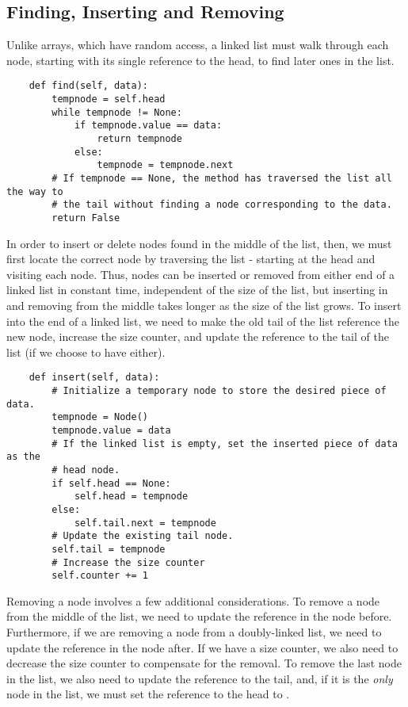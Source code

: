 \subsection*{Finding, Inserting and Removing}
Unlike arrays, which have random access, a linked list must walk through each node, starting with its single reference to the head, to find later ones in the list.
\begin{lstlisting}
    def find(self, data):
        tempnode = self.head
        while tempnode != None:
            if tempnode.value == data:
                return tempnode
            else:
                tempnode = tempnode.next
        # If tempnode == None, the method has traversed the list all the way to
        # the tail without finding a node corresponding to the data.
        return False
\end{lstlisting}
In order to insert or delete nodes found in the middle of the list, then, we must first locate the correct node by traversing the list - starting at the head and visiting each node.
Thus, nodes can be inserted or removed from either end of a linked list in constant time, independent of the size of the list, but inserting in and removing from the middle takes longer as the size of the list grows.
To insert into the end of a linked list, we need to make the old tail of the list reference the new node, increase the size counter, and update the reference to the tail of the list (if we choose to have either).

\begin{lstlisting}
    def insert(self, data):
        # Initialize a temporary node to store the desired piece of data.
        tempnode = Node()
        tempnode.value = data
        # If the linked list is empty, set the inserted piece of data as the
        # head node.
        if self.head == None:
            self.head = tempnode
        else:
            self.tail.next = tempnode
        # Update the existing tail node.
        self.tail = tempnode
        # Increase the size counter
        self.counter += 1
\end{lstlisting}

Removing a node involves a few additional considerations.
To remove a node from the middle of the list, we need to update the reference in the node before.
Furthermore, if we are removing a node from a doubly-linked list, we need to update the reference in the node after.
If we have a size counter, we also need to decrease the size counter to compensate for the removal.
To remove the last node in the list, we also need to update the reference to the tail, and, if it is the \emph{only} node in the list, we must set the reference to the head to .

